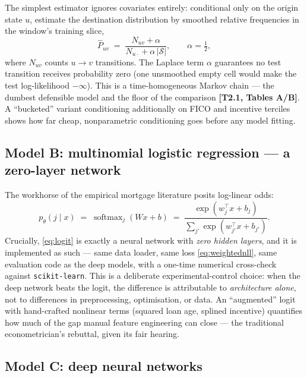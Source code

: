 \documentclass[11pt,a4paper]{article}
\newcommand{\code}[1]{\texttt{#1}}
\newcommand{\artifact}[1]{\textbf{[#1]}}
\begin{document}
The simplest estimator ignores covariates entirely: conditional only on the origin state $u$, estimate the destination distribution by smoothed relative frequencies in the window's training slice,
\begin{equation}
\label{eq:empirical}
\widehat{P}_{uv} \;=\; \frac{N_{uv} + \alpha}{N_{u\cdot} + \alpha\,|\mathcal{S}|}, \qquad \alpha = \tfrac12,
\end{equation}
where $N_{uv}$ counts $u\to v$ transitions. The Laplace term $\alpha$ guarantees no test transition receives probability zero (one unsmoothed empty cell would make the test log-likelihood $-\infty$). This is a time-homogeneous Markov chain --- the dumbest defensible model and the floor of the comparison \artifact{T2.1, Tables A/B}. A ``bucketed'' variant conditioning additionally on FICO and incentive terciles shows how far cheap, nonparametric conditioning goes before any model fitting.

\subsection{Model B: multinomial logistic regression --- a zero-layer network}

The workhorse of the empirical mortgage literature posits log-linear odds:
\begin{equation}
\label{eq:logit}
p_\theta(j \mid x) \;=\; \operatorname{softmax}_j\!\left(Wx + b\right)
\;=\; \frac{\exp\!\left(w_j^\top x + b_j\right)}{\sum_{j'} \exp\!\left(w_{j'}^\top x + b_{j'}\right)}.
\end{equation}
Crucially, \eqref{eq:logit} is exactly a neural network with \emph{zero hidden layers}, and it is implemented as such --- same data loader, same loss \eqref{eq:weightednll}, same evaluation code as the deep models, with a one-time numerical cross-check against \code{scikit-learn}. This is a deliberate experimental-control choice: when the deep network beats the logit, the difference is attributable to \emph{architecture alone}, not to differences in preprocessing, optimisation, or data. An ``augmented'' logit with hand-crafted nonlinear terms (squared loan age, splined incentive) quantifies how much of the gap manual feature engineering can close --- the traditional econometrician's rebuttal, given its fair hearing.

\subsection{Model C: deep neural networks}
\end{document}
